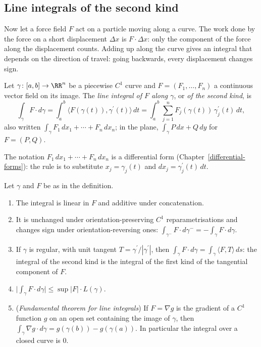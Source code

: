 \subsection{Line integrals of the second kind}\label{real-analysis:subsection-second-kind}

Now let a force field $F$ act on a particle moving along a curve. The work done by the force on a short displacement $\Delta x$ is $F \cdot \Delta x$: only the component of the force along the
displacement counts. Adding up along the curve gives an integral that depends on the direction of travel: going backwards, every displacement changes sign.

\begin{definition}\label{real-analysis:definition-second-kind}
Let $\gamma \colon [a, b] \to \RR^n$ be a piecewise $C^1$ curve and $F = (F_1, \ldots, F_n)$ a continuous vector field on its image. The \emph{line integral of $F$ along $\gamma$}, or \emph{of the second kind},
is
\[
\int_\gamma F \cdot d\gamma = \int_a^b\bigl\langle F(\gamma(t)), \gamma^{\prime}(t)\bigr\rangle\,dt = \int_a^b\sum_{j=1}^nF_j(\gamma(t))\,\gamma_j^{\prime}(t)\,dt,
\]
also written $\int_\gamma F_1\,dx_1 + \cdots + F_n\,dx_n$; in the plane, $\int_\gamma P\,dx + Q\,dy$ for $F = (P, Q)$.
\end{definition}

The notation $F_1\,dx_1 + \cdots + F_n\,dx_n$ is a differential form (Chapter~\ref{differential-forms}): the rule is to substitute $x_j = \gamma_j(t)$ and $dx_j = \gamma_j^{\prime}(t)\,dt$.

\begin{proposition}\label{real-analysis:proposition-second-kind}
Let $\gamma$ and $F$ be as in the definition.
\begin{enumerate}
\item The integral is linear in $F$ and additive under concatenation.
\item It is unchanged under orientation-preserving $C^1$ reparametrisations and changes sign under orientation-reversing ones: $\int_{\gamma^-}F \cdot d\gamma^- = -\int_\gamma F \cdot d\gamma$.
\item If $\gamma$ is regular, with unit tangent $T = \gamma^{\prime}/|\gamma^{\prime}|$, then $\int_\gamma F \cdot d\gamma = \int_\gamma\langle F, T\rangle\,ds$: the integral of the second kind is the integral of the first kind of
the tangential component of $F$.
\item $\bigl|\int_\gamma F \cdot d\gamma\bigr| \leq \sup|F| \cdot L(\gamma)$.
\item (\emph{Fundamental theorem for line integrals}) If $F = \nabla g$ is the gradient of a $C^1$ function $g$ on an open set containing the image of $\gamma$, then
$\int_\gamma\nabla g \cdot d\gamma = g(\gamma(b)) - g(\gamma(a))$. In particular the integral over a closed curve is $0$.
\end{enumerate}
\end{proposition}

